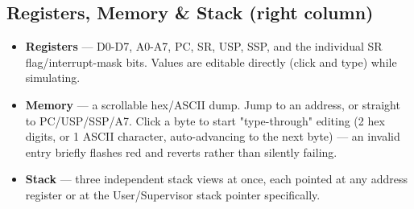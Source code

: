 \subsection*{Registers, Memory \& Stack (right column)}
\begin{itemize}
\item \textbf{Registers} — D0-D7, A0-A7, PC, SR, USP, SSP, and the individual SR flag/interrupt-mask bits. Values are editable directly (click and type) while simulating.
\item \textbf{Memory} — a scrollable hex/ASCII dump. Jump to an address, or straight to PC/USP/SSP/A7. Click a byte to start "type-through" editing (2 hex digits, or 1 ASCII character, auto-advancing to the next byte) — an invalid entry briefly flashes red and reverts rather than silently failing.
\item \textbf{Stack} — three independent stack views at once, each pointed at any address register or at the User/Supervisor stack pointer specifically.
\end{itemize}